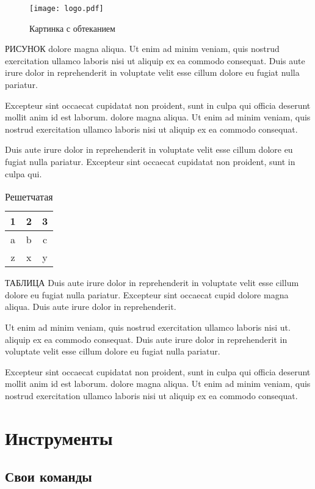 \documentclass[a4paper,12pt]{article}%
\theoremstyle{plain}%
\theoremstyle{definition}%
\theoremstyle{remark}%
\begin{document}
\begin{wrapfigure}[15]{l}{0.3\textwidth}
\texttt{[image: logo.pdf]}
\caption{Картинка с обтеканием}
\end{wrapfigure}

РИСУНОК dolore magna aliqua. Ut enim ad minim veniam,
quis nostrud exercitation ullamco laboris nisi ut 
aliquip ex ea commodo consequat. Duis aute irure dolor
in reprehenderit in voluptate velit esse
cillum dolore eu fugiat nulla pariatur.

Excepteur sint occaecat cupidatat non proident, sunt in culpa qui 
officia deserunt mollit anim id est laborum.
dolore magna aliqua. Ut enim ad minim veniam,
quis nostrud exercitation ullamco laboris nisi ut 
aliquip ex ea commodo consequat.

Duis aute irure dolor in reprehenderit in voluptate velit esse
cillum dolore eu fugiat nulla pariatur. Excepteur sint
occaecat cupidatat non proident, sunt in culpa qui.

\begin{wraptable}{r}{0.25\linewidth}
\caption{Решетчатая}
\begin{tabular}{|c|c|c|}
 \hline 1 & 2 & 3 \\
\hline a & b & c \\
\hline z & x & y \\
\hline
\end{tabular}
\end{wraptable}

ТАБЛИЦА Duis aute irure dolor 
in reprehenderit in voluptate velit esse
cillum dolore eu fugiat nulla pariatur. Excepteur sint
occaecat cupid dolore magna aliqua. Duis aute irure dolor
in reprehenderit.

Ut enim ad minim veniam, quis nostrud exercitation ullamco
 laboris nisi ut.
aliquip ex ea commodo consequat. Duis aute irure dolor
in reprehenderit in voluptate velit esse
cillum dolore eu fugiat nulla pariatur.

Excepteur sint occaecat cupidatat non proident, sunt in culpa qui 
officia deserunt mollit anim id est laborum.
dolore magna aliqua. Ut enim ad minim veniam,
quis nostrud exercitation ullamco laboris nisi ut 
aliquip ex ea commodo consequat.



\section{Инструменты}
\subsection{Свои команды}
\end{document}

